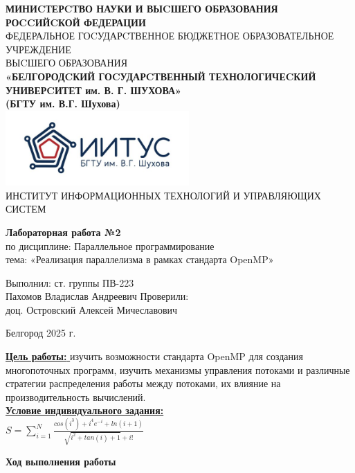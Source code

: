\documentclass[a4paper,14pt]{extarticle}
\newcommand\textbox[1]{
	\parbox{.45\textwidth}{#1}
}
\begin{document}
\begin{center}
    \small{
        \textbf{МИНИCТЕРCТВО НАУКИ И ВЫCШЕГО ОБРАЗОВАНИЯ РОCCИЙCКОЙ ФЕДЕРАЦИИ}\\
        ФЕДЕРАЛЬНОЕ ГОCУДАРCТВЕННОЕ БЮДЖЕТНОЕ ОБРАЗОВАТЕЛЬНОЕ УЧРЕЖДЕНИЕ\\ВЫCШЕГО ОБРАЗОВАНИЯ \\
        \textbf{«БЕЛГОРОДCКИЙ ГОCУДАРCТВЕННЫЙ ТЕХНОЛОГИЧЕCКИЙ\\УНИВЕРCИТЕТ им. В. Г. ШУХОВА»\\ (БГТУ им. В.Г. Шухова)} \\
        \bigbreak
        \includegraphics[width=70mm]{log}\\
        ИНСТИТУТ ИНФОРМАЦИОННЫХ ТЕХНОЛОГИЙ И УПРАВЛЯЮЩИХ СИСТЕМ\\}
\end{center}

\vfill
\begin{center}
    \large{
        \textbf{
            Лабораторная работа №2}}\\
    \normalsize{
        по дисциплине: Параллельное программирование \\
        тема: «Реализация параллелизма в рамках стандарта OpenMP»}
\end{center}
\vfill
\hfill\textbox{
    Выполнил: ст. группы ПВ-223\\Пахомов Владислав Андреевич
    \bigbreak
    Проверили: \\доц. Островский Алексей Мичеславович
}
\vfill\begin{center}
    Белгород 2025 г.
\end{center}
\newpage
\underline{\textbf{Цель работы: }}изучить возможности стандарта OpenMP для создания многопоточных
программ, изучить механизмы управления потоками и различные стратегии распределения
работы между потоками, их влияние на производительность вычислений.\\
\underline{\textbf{Условие индивидуального задания: }}\\

$S = \sum_{i = 1}^{N} \frac{cos(i^3) + i^4 e^{-i} + ln(i + 1)}{\sqrt{i ^ 2 + tan(i) + 1} + i!}$
\begin{center}
\textbf{Ход выполнения работы}
\end{center}
\end{document}
